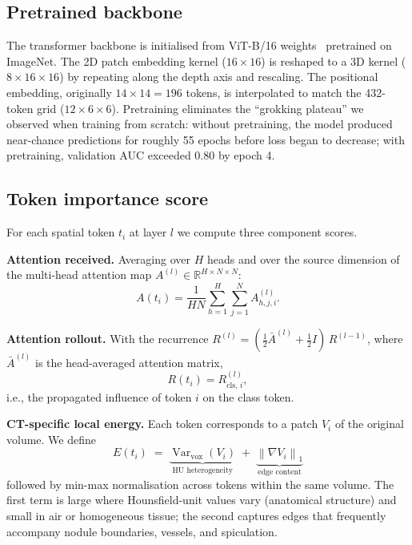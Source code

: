 \documentclass[journal]{IEEEtran}
\DeclareMathOperator*{\Var}{Var}
\newcommand{\norm}[1]{\left\lVert#1\right\rVert}
\begin{document}
\subsection{Pretrained backbone}\label{ssec:pretrained}
The transformer backbone is initialised from ViT-B/16
weights~\cite{dosovitskiy2021} pretrained on ImageNet. The 2D patch embedding
kernel ($16\!\times\!16$) is reshaped to a 3D kernel
($8\!\times\!16\!\times\!16$) by repeating along the depth axis and
rescaling. The positional embedding, originally $14\!\times\!14 = 196$
tokens, is interpolated to match the 432-token grid ($12\!\times\!6\!\times\!6$).
Pretraining eliminates the ``grokking plateau'' we observed when training from
scratch: without pretraining, the model produced near-chance predictions for
roughly 55 epochs before loss began to decrease; with pretraining, validation
AUC exceeded 0.80 by epoch 4.

\subsection{Token importance score}\label{ssec:score}
For each spatial token $t_i$ at layer $l$ we compute three component scores.

\textbf{Attention received.} Averaging over $H$ heads and over the source
dimension of the multi-head attention map $A^{(l)} \in \mathbb{R}^{H\times N\times N}$:
\begin{equation}
    A(t_i) = \frac{1}{H N} \sum_{h=1}^{H} \sum_{j=1}^{N} A^{(l)}_{h,j,i}.
\end{equation}

\textbf{Attention rollout.} With the recurrence
$R^{(l)} = (\tfrac{1}{2} \bar{A}^{(l)} + \tfrac{1}{2} I)\, R^{(l-1)}$,
where $\bar{A}^{(l)}$ is the head-averaged attention matrix,
\begin{equation}
    R(t_i) = R^{(l)}_{\mathrm{cls},\, i},
\end{equation}
i.e., the propagated influence of token $i$ on the class token.

\textbf{CT-specific local energy.} Each token corresponds to a patch $V_i$ of
the original volume. We define
\begin{equation}
    E(t_i) \;=\; \underbrace{\Var_{\mathrm{vox}}(V_i)}_{\text{HU heterogeneity}}
    \;+\; \underbrace{\norm{\nabla V_i}_{1}}_{\text{edge content}}
\end{equation}
followed by min-max normalisation across tokens within the same volume. The
first term is large where Hounsfield-unit values vary (anatomical structure)
and small in air or homogeneous tissue; the second captures edges that
frequently accompany nodule boundaries, vessels, and spiculation.
\end{document}
